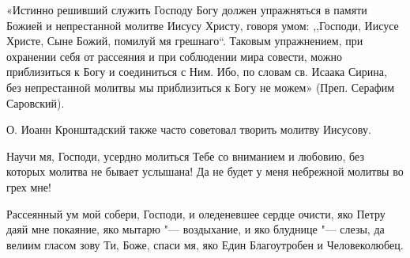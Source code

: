 \begin{mymulticols}
«Истинно решивший служить Господу Богу должен упражняться в памяти Божией и непрестанной молитве Иисусу Христу, говоря умом: ,,Господи, Иисусе Христе, Сыне Божий, помилуй мя грешнаго``. Таковым упражнением, при охранении себя от рассеяния и при соблюдении мира совести, можно приблизиться к Богу и соединиться с Ним. Ибо, по словам св. Исаака Сирина, без непрестанной молитвы мы приблизиться к Богу не можем» (Преп. Серафим Саровский). 

О. Иоанн Кронштадский также часто советовал творить молитву Иисусову.

\end{mymulticols}

\mychapterending

 





Научи мя, Господи, усердно молиться Тебе со вниманием и любовию, без которых молитва не бывает услышана! Да не будет у меня небрежной молитвы во грех мне!

 


\mychapterending

 





Рассеянный ум мой собери, Господи, и оледеневшее сердце очисти, яко Петру даяй мне покаяние, яко мытарю "--- воздыхание, и яко блуднице "--- слезы, да велиим гласом зову Ти, Боже, спаси мя, яко Един Благоутробен и Человеколюбец. 




\mychapterending

 

